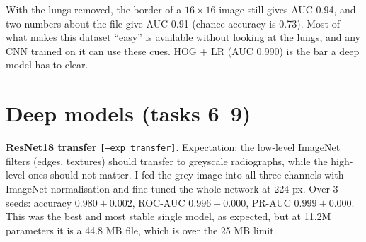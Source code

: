 \documentclass[10pt,a4paper]{article}
\newcommand{\src}[1]{{\footnotesize\texttt{[#1]}}}
\begin{document}
With the lungs removed, the border of a $16\times16$ image still gives AUC 0.94, and two numbers about the file give AUC 0.91 (chance accuracy is 0.73).
Most of what makes this dataset ``easy'' is available without looking at the lungs, and any CNN trained on it can use these cues.
HOG + LR (AUC 0.990) is the bar a deep model has to clear.

\section{Deep models (tasks 6--9)}

\textbf{ResNet18 transfer} \src{--exp transfer}. Expectation: the low-level ImageNet filters (edges, textures) should transfer to greyscale
radiographs, while the high-level ones should not matter. I fed the grey image into all three channels with ImageNet normalisation and fine-tuned the whole network at 224 px.
Over 3 seeds: accuracy $0.980\pm0.002$, ROC-AUC $0.996\pm0.000$, PR-AUC $0.999\pm0.000$. This was the best and most stable single model, as expected,
but at 11.2M parameters it is a 44.8 MB file, which is over the 25 MB limit.
\end{document}
